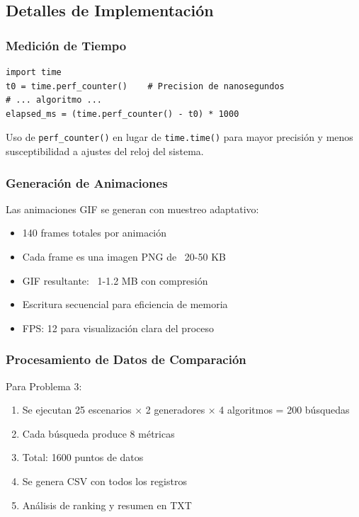 \documentclass[12pt,a4paper]{article}
\begin{document}
\subsection{Detalles de Implementación}

\subsubsection{Medición de Tiempo}

\begin{lstlisting}
import time
t0 = time.perf_counter()    # Precision de nanosegundos
# ... algoritmo ...
elapsed_ms = (time.perf_counter() - t0) * 1000
\end{lstlisting}

Uso de \texttt{perf\_counter()} en lugar de \texttt{time.time()} para mayor precisión y menos susceptibilidad a ajustes del reloj del sistema.

\subsubsection{Generación de Animaciones}

Las animaciones GIF se generan con muestreo adaptativo:

\begin{itemize}
    \item 140 frames totales por animación
    \item Cada frame es una imagen PNG de ~20-50 KB
    \item GIF resultante: ~1-1.2 MB con compresión
    \item Escritura secuencial para eficiencia de memoria
    \item FPS: 12 para visualización clara del proceso
\end{itemize}

\subsubsection{Procesamiento de Datos de Comparación}

Para Problema 3:
\begin{enumerate}
    \item Se ejecutan 25 escenarios × 2 generadores × 4 algoritmos = 200 búsquedas
    \item Cada búsqueda produce 8 métricas
    \item Total: 1600 puntos de datos
    \item Se genera CSV con todos los registros
    \item Análisis de ranking y resumen en TXT
\end{enumerate}
\end{document}

